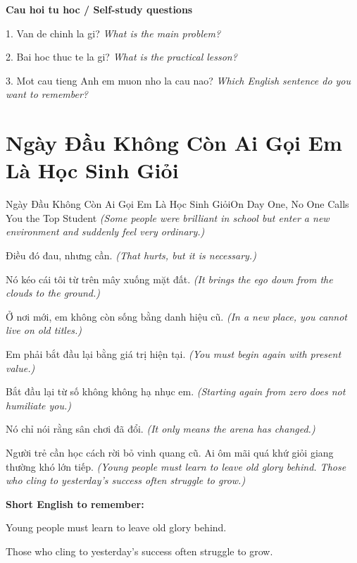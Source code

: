 \begin{tuhocnhanh}
\textbf{Cau hoi tu hoc / Self-study questions}

1. Van de chinh la gi? \textit{What is the main problem?}

2. Bai hoc thuc te la gi? \textit{What is the practical lesson?}

3. Mot cau tieng Anh em muon nho la cau nao? \textit{Which English sentence do you want to remember?}
\end{tuhocnhanh}
\ngancach

\section{Ngày Đầu Không Còn Ai Gọi Em Là Học Sinh Giỏi}
\begin{truyen}{Ngày Đầu Không Còn Ai Gọi Em Là Học Sinh Giỏi}{On Day One, No One Calls You the Top Student}
\textit{(Some people were brilliant in school but enter a new environment and suddenly feel very ordinary.)}

Điều đó đau, nhưng cần.
\textit{(That hurts, but it is necessary.)}

Nó kéo cái tôi từ trên mây xuống mặt đất.
\textit{(It brings the ego down from the clouds to the ground.)}

Ở nơi mới, em không còn sống bằng danh hiệu cũ.
\textit{(In a new place, you cannot live on old titles.)}

Em phải bắt đầu lại bằng giá trị hiện tại.
\textit{(You must begin again with present value.)}

Bắt đầu lại từ số không không hạ nhục em.
\textit{(Starting again from zero does not humiliate you.)}

Nó chỉ nói rằng sân chơi đã đổi.
\textit{(It only means the arena has changed.)}

\end{truyen}

\begin{baihoc}
Người trẻ cần học cách rời bỏ vinh quang cũ. Ai ôm mãi quá khứ giỏi giang thường khó lớn tiếp.
\textit{(Young people must learn to leave old glory behind. Those who cling to yesterday’s success often struggle to grow.)}
\end{baihoc}

\begin{ghinhoanh}
\textbf{Short English to remember:}

Young people must learn to leave old glory behind.

Those who cling to yesterday’s success often struggle to grow.

\end{ghinhoanh}

